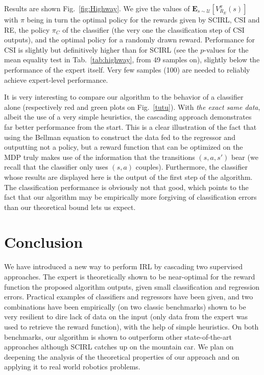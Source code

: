 \documentclass{llncs}
\begin{document}
Results are shown Fig.~\ref{fig:Highway}. We give the values of $\mathbf{E}_{s\sim\mathcal{U}}[V^{\pi}_{R_E}(s)]$ with $\pi$ being in turn the optimal policy for the rewards given by SCIRL, CSI and RE, the policy $\pi_C$ of the classifier (the very one the classification step of CSI outputs), and the optimal policy for a randomly drawn reward. Performance for CSI is slightly but definitively higher than for SCIRL (see the $p$-values for the mean equality test in Tab.~\ref{tab:highway}, from 49 samples on), slightly below the performance of the expert itself. Very few samples (100) are needed to reliably achieve expert-level performance.

It is very interesting to compare our algorithm to the behavior of a classifier alone (respectively red and green plots on Fig.~\ref{tutu}). With \emph{the exact same data}, albeit the use of a very simple heuristics, the cascading approach demonstrates far better performance from the start. This is a clear illustration of the fact that using the Bellman equation to construct the data fed to the regressor and outputting not a policy, but a reward function that can be optimized on the MDP truly makes use of the information that the transitions $(s,a,s')$ bear (we recall that the classifier only uses $(s,a)$ couples). Furthermore, the classifier whose results are displayed here is the output of the first step of the algorithm. The classification performance is obviously not that good, which points to the fact that our algorithm may be empirically more forgiving of classification errors than our theoretical bound lets us expect.

\section{Conclusion}
\label{sec:conclusion}
We have introduced a new way to perform IRL by cascading two supervised approaches. The expert is theoretically shown to be near-optimal for the reward function the proposed algorithm outputs, given small classification and regression errors. Practical examples of classifiers and regressors have been given, and two combinations have been empirically (on two classic benchmarks) shown to be very resilient to dire lack of data on the input (only data from the expert was used to retrieve the reward function), with the help of simple heuristics. On both benchmarks, our algorithm is shown to outperform other state-of-the-art approaches although SCIRL catches up on the mountain car. We plan on deepening the analysis of the theoretical properties of our approach and on applying it to real world robotics problems.



\end{document}
